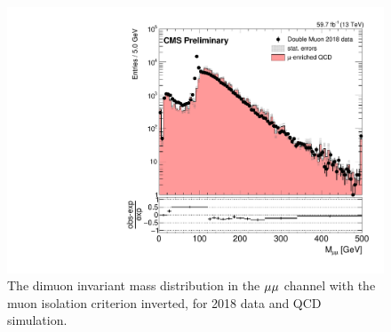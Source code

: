 \begin{figure}[hbtp]
\centering
\includegraphics[scale=0.4]{figures/bg/mumuInvMass_qcd_vs_data.pdf}
\caption{The dimuon invariant mass distribution in the ${\mu}{\mu}$ channel with the muon isolation criterion inverted, for 2018 data and QCD simulation.
}
\label{mumu_inv_mass_inverted_iso}
\end{figure}